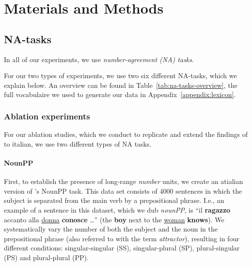 \section{Materials and Methods}

\subsection{NA-tasks}

In all of our experiments, we use \emph{number-agreement (NA) tasks}.

For our two types of experiments, we use two six different NA-tasks, which we explain below.
An overview can be found in Table~\ref{tab:na-tasks-overview}, the full vocabulaire we used to generate our data in Appendix~\ref{appendix:lexicon}.

\subsubsection{Ablation experiments}
For our ablation studies, which we conduct to replicate and extend the findings of \citet{lakretz2019emergence} to italian, we use two different types of NA tasks.

\paragraph{NounPP}
First, to establish the presence of long-range \emph{number} units, we create an atialian version of \citeauthor{lakretz2019emergence}'s \citeyear{lakretz2019emergence} NounPP task.
This data set consists of 4000 sentences in which the subject is separated from the main verb by a prepositional phrase.
I.e., an example of a sentence in this dataset, which we dub \emph{nounPP}, is ``il \textbf{ragazzo} accanto alla \underline{donna} \textbf{conosce} \ldots'' (the \textbf{boy} next to the \underline{woman} \textbf{knows}).
We systematically vary the number of both the subject and the noun in the prepositional phrase (also referred to with the term \emph{attractor}), resulting in four different conditions: singular-singular (SS), singular-plural (SP), plural-singular (PS) and plural-plural (PP).

